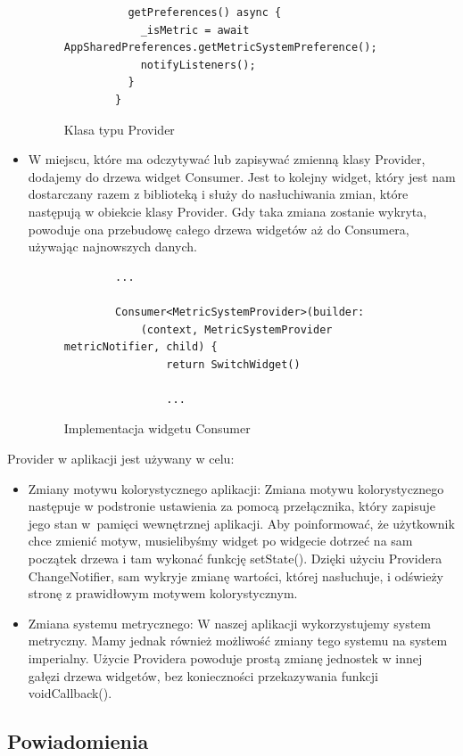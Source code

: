 \documentclass[a4paper,twoside,12pt]{book}
\begin{document}
\begin{itemize}
\begin{figure}[H]
\begin{lstlisting}
          getPreferences() async {
            _isMetric = await AppSharedPreferences.getMetricSystemPreference();
            notifyListeners();
          }
        }
        \end{lstlisting}
    \caption{Klasa typu Provider}
    \label{fig:pseudokod:listings}
    \end{figure}
    \item W miejscu, które ma odczytywać lub zapisywać zmienną klasy Provider, dodajemy do drzewa widget Consumer. Jest to kolejny widget, który jest nam dostarczany razem z biblioteką i służy do nasłuchiwania zmian, które następują w obiekcie klasy Provider. Gdy taka zmiana zostanie wykryta, powoduje ona przebudowę całego drzewa widgetów aż do Consumera, używając najnowszych danych.
    \begin{figure}[H]
        \begin{lstlisting}
        ...
        
        Consumer<MetricSystemProvider>(builder:
            (context, MetricSystemProvider metricNotifier, child) {
                return SwitchWidget()

                ...
        \end{lstlisting}
    \caption{Implementacja widgetu Consumer}
    \label{fig:pseudokod:listings}
    \end{figure}
\end{itemize}

Provider w aplikacji jest używany w celu:
\begin{itemize}
    \item Zmiany motywu kolorystycznego aplikacji: Zmiana motywu kolorystycznego następuje w podstronie ustawienia za pomocą przełącznika, który zapisuje jego stan w~pamięci wewnętrznej aplikacji. Aby poinformować, że użytkownik chce zmienić motyw, musielibyśmy widget po widgecie dotrzeć na sam początek drzewa i tam wykonać funkcję setState(). Dzięki użyciu Providera ChangeNotifier, sam wykryje zmianę wartości, której nasłuchuje, i odświeży stronę z prawidłowym motywem kolorystycznym. 
    \item Zmiana systemu metrycznego: W naszej aplikacji wykorzystujemy system metryczny. Mamy jednak również możliwość zmiany tego systemu na system imperialny. Użycie Providera powoduje prostą zmianę jednostek w innej gałęzi drzewa widgetów, bez konieczności przekazywania funkcji voidCallback().
\end{itemize}

\subsection{Powiadomienia}
\end{document}
